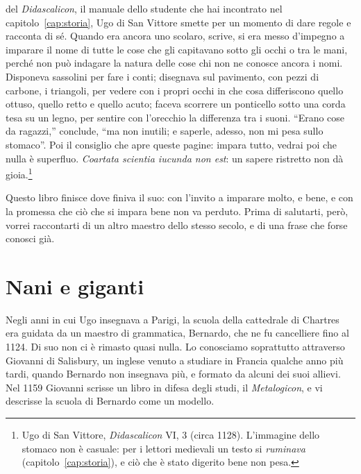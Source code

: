  del \emph{Didascalicon}, il manuale dello
studente che hai incontrato nel capitolo~\ref{cap:storia}, Ugo di San
Vittore smette per un momento di dare regole e racconta di sé. Quando
era ancora uno scolaro, scrive, si era messo d'impegno a imparare il
nome di tutte le cose che gli capitavano sotto gli occhi o tra le
mani, perché non può indagare la natura delle cose chi non ne conosce
ancora i nomi. Disponeva sassolini per fare i conti; disegnava sul
pavimento, con pezzi di carbone, i triangoli, per vedere con i propri
occhi in che cosa differiscono quello ottuso, quello retto e quello
acuto; faceva scorrere un ponticello sotto una corda tesa su un legno,
per sentire con l'orecchio la differenza tra i suoni. \enquote{Erano
cose da ragazzi,} conclude, \enquote{ma non inutili; e saperle, adesso,
non mi pesa sullo stomaco}. Poi il consiglio che apre queste pagine:
impara tutto, vedrai poi che nulla è superfluo. \emph{Coartata scientia
iucunda non est}: un sapere ristretto non dà gioia.\footnote{Ugo di San
Vittore, \emph{Didascalicon} VI, 3 (circa 1128). L'immagine dello
stomaco non è casuale: per i lettori medievali un testo si
\emph{ruminava} (capitolo~\ref{cap:storia}), e ciò che è stato
digerito bene non pesa.}

Questo libro finisce dove finiva il suo: con l'invito a imparare molto,
e bene, e con la promessa che ciò che si impara bene non va perduto.
Prima di salutarti, però, vorrei raccontarti di un altro maestro dello
stesso secolo, e di una frase che forse conosci già.

\section*{Nani e giganti}

Negli anni in cui Ugo insegnava a Parigi, la scuola della cattedrale
di Chartres era guidata da un maestro di grammatica, Bernardo, che ne
fu cancelliere fino al 1124. Di suo non ci è rimasto quasi nulla. Lo
conosciamo soprattutto attraverso Giovanni di Salisbury, un inglese
venuto a studiare in Francia qualche anno più tardi, quando Bernardo
non insegnava più, e formato da alcuni dei suoi allievi. Nel 1159
Giovanni scrisse un libro in difesa degli studi, il \emph{Metalogicon},
e vi descrisse la scuola di Bernardo come un modello.


